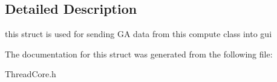 \subsection{Detailed Description}
this struct is used for sending GA data from this compute class into gui 

The documentation for this struct was generated from the following file:\begin{DoxyCompactItemize}
\item 
ThreadCore.h\end{DoxyCompactItemize}
